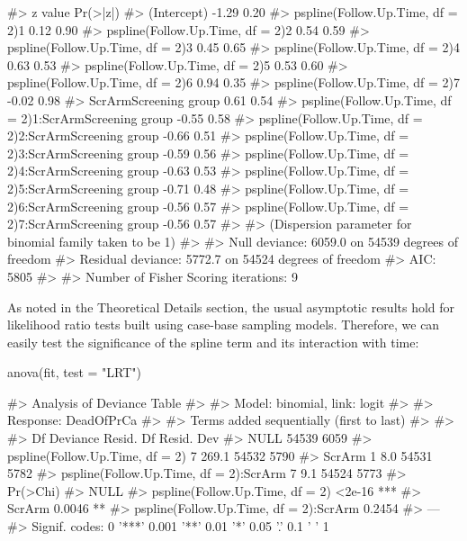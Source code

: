 \begin{Schunk}
\begin{Soutput}
#>                                                        z value Pr(>|z|)
#> (Intercept)                                              -1.29     0.20
#> pspline(Follow.Up.Time, df = 2)1                          0.12     0.90
#> pspline(Follow.Up.Time, df = 2)2                          0.54     0.59
#> pspline(Follow.Up.Time, df = 2)3                          0.45     0.65
#> pspline(Follow.Up.Time, df = 2)4                          0.63     0.53
#> pspline(Follow.Up.Time, df = 2)5                          0.53     0.60
#> pspline(Follow.Up.Time, df = 2)6                          0.94     0.35
#> pspline(Follow.Up.Time, df = 2)7                         -0.02     0.98
#> ScrArmScreening group                                     0.61     0.54
#> pspline(Follow.Up.Time, df = 2)1:ScrArmScreening group   -0.55     0.58
#> pspline(Follow.Up.Time, df = 2)2:ScrArmScreening group   -0.66     0.51
#> pspline(Follow.Up.Time, df = 2)3:ScrArmScreening group   -0.59     0.56
#> pspline(Follow.Up.Time, df = 2)4:ScrArmScreening group   -0.63     0.53
#> pspline(Follow.Up.Time, df = 2)5:ScrArmScreening group   -0.71     0.48
#> pspline(Follow.Up.Time, df = 2)6:ScrArmScreening group   -0.56     0.57
#> pspline(Follow.Up.Time, df = 2)7:ScrArmScreening group   -0.56     0.57
#> 
#> (Dispersion parameter for binomial family taken to be 1)
#> 
#>     Null deviance: 6059.0  on 54539  degrees of freedom
#> Residual deviance: 5772.7  on 54524  degrees of freedom
#> AIC: 5805
#> 
#> Number of Fisher Scoring iterations: 9
\end{Soutput}
\end{Schunk}

As noted in the Theoretical Details section, the usual asymptotic
results hold for likelihood ratio tests built using case-base sampling
models. Therefore, we can easily test the significance of the spline
term and its interaction with time:

\begin{Schunk}
\begin{Sinput}
anova(fit, test = "LRT")
\end{Sinput}
\begin{Soutput}
#> Analysis of Deviance Table
#> 
#> Model: binomial, link: logit
#> 
#> Response: DeadOfPrCa
#> 
#> Terms added sequentially (first to last)
#> 
#> 
#>                                        Df Deviance Resid. Df Resid. Dev
#> NULL                                                   54539       6059
#> pspline(Follow.Up.Time, df = 2)         7    269.1     54532       5790
#> ScrArm                                  1      8.0     54531       5782
#> pspline(Follow.Up.Time, df = 2):ScrArm  7      9.1     54524       5773
#>                                        Pr(>Chi)    
#> NULL                                               
#> pspline(Follow.Up.Time, df = 2)          <2e-16 ***
#> ScrArm                                   0.0046 ** 
#> pspline(Follow.Up.Time, df = 2):ScrArm   0.2454    
#> ---
#> Signif. codes:  0 '***' 0.001 '**' 0.01 '*' 0.05 '.' 0.1 ' ' 1
\end{Soutput}
\end{Schunk}

